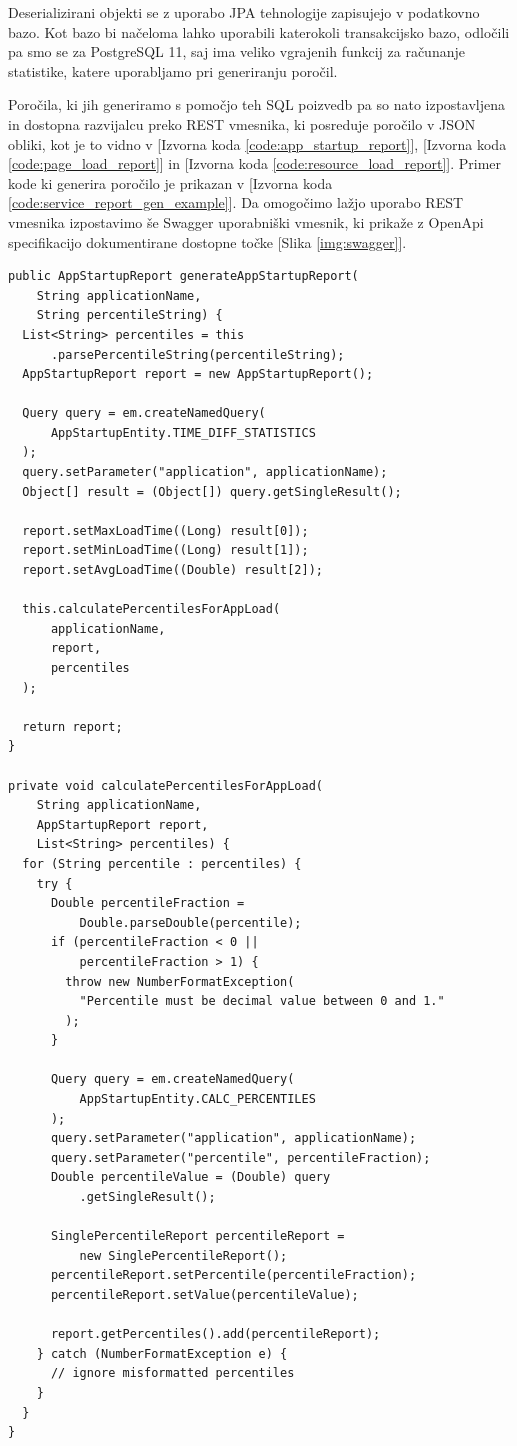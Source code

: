\documentclass[a4paper, 12pt]{book}
\begin{document}
Deserializirani objekti se z uporabo JPA tehnologije zapisujejo v podatkovno bazo. Kot bazo bi načeloma lahko uporabili katerokoli transakcijsko bazo, odločili pa smo se za PostgreSQL 11, saj ima veliko vgrajenih funkcij za računanje statistike, katere uporabljamo pri generiranju poročil.

Poročila, ki jih generiramo s pomočjo teh SQL poizvedb pa so nato izpostavljena in dostopna razvijalcu preko REST vmesnika, ki posreduje poročilo v JSON obliki, kot je to vidno v [Izvorna koda \ref{code:app_startup_report}],  [Izvorna koda \ref{code:page_load_report}] in  [Izvorna koda \ref{code:resource_load_report}]. Primer kode ki generira poročilo je prikazan v [Izvorna koda \ref{code:service_report_gen_example}]. Da omogočimo lažjo uporabo REST vmesnika izpostavimo še Swagger uporabniški vmesnik, ki prikaže z OpenApi specifikacijo dokumentirane dostopne točke [Slika \ref{img:swagger}].

\begin{lstlisting}[label=code:service_report_gen_example, caption=Pridobivanje poročila o zagonskem času aplikacije]
public AppStartupReport generateAppStartupReport(
    String applicationName,
    String percentileString) {
  List<String> percentiles = this
      .parsePercentileString(percentileString);
  AppStartupReport report = new AppStartupReport();

  Query query = em.createNamedQuery(
      AppStartupEntity.TIME_DIFF_STATISTICS
  );
  query.setParameter("application", applicationName);
  Object[] result = (Object[]) query.getSingleResult();

  report.setMaxLoadTime((Long) result[0]);
  report.setMinLoadTime((Long) result[1]);
  report.setAvgLoadTime((Double) result[2]);

  this.calculatePercentilesForAppLoad(
      applicationName,
      report,
      percentiles
  );

  return report;
}

private void calculatePercentilesForAppLoad(
    String applicationName,
    AppStartupReport report,
    List<String> percentiles) {
  for (String percentile : percentiles) {
    try {
      Double percentileFraction = 
          Double.parseDouble(percentile);
      if (percentileFraction < 0 ||
          percentileFraction > 1) {
        throw new NumberFormatException(
          "Percentile must be decimal value between 0 and 1."
        );
      }
  
      Query query = em.createNamedQuery(
          AppStartupEntity.CALC_PERCENTILES
      );
      query.setParameter("application", applicationName);
      query.setParameter("percentile", percentileFraction);
      Double percentileValue = (Double) query
          .getSingleResult();

      SinglePercentileReport percentileReport = 
          new SinglePercentileReport();
      percentileReport.setPercentile(percentileFraction);
      percentileReport.setValue(percentileValue);

      report.getPercentiles().add(percentileReport);
    } catch (NumberFormatException e) {
      // ignore misformatted percentiles
    }
  }
}
\end{lstlisting} 
\end{document}
